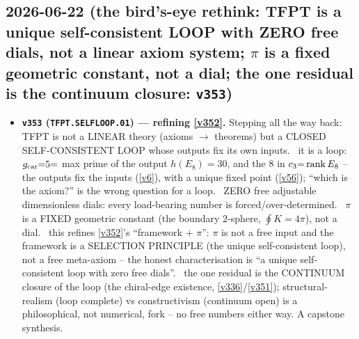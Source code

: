 \subsection*{2026-06-22 (the bird's-eye rethink: TFPT is a unique self-consistent LOOP with ZERO free dials, not a linear axiom system; $\pi$ is a fixed geometric constant, not a dial; the one residual is the continuum closure: \texttt{v353})}
\begin{itemize}
\item \textbf{\texttt{v353} (\texttt{TFPT.SELFLOOP.01}) --- refining \vref{v352}.} Stepping all the way back: TFPT is
not a LINEAR theory (axioms $\to$ theorems) but a CLOSED SELF-CONSISTENT LOOP whose outputs fix its own inputs.
\mE\ it is a loop: $g_{\mathrm{car}}{=}5{=}$ max prime of the output $h(E_8){=}30$, and the $8$ in $c_3{=}\operatorname{rank}
E_8$ -- the outputs fix the inputs (\vref{v6}), with a unique fixed point (\vref{v56}); ``which is the axiom?'' is
the wrong question for a loop. \mE\ ZERO free adjustable dimensionless dials: every load-bearing number is
forced/over-determined. \mE\ $\pi$ is a FIXED geometric constant (the boundary $2$-sphere, $\oint K{=}4\pi$), not a
dial. \mC\ this refines \vref{v352}'s ``framework $+$ $\pi$'': $\pi$ is not a free input and the framework is a
SELECTION PRINCIPLE (the unique self-consistent loop), not a free meta-axiom -- the honest characterisation is ``a
unique self-consistent loop with zero free dials''. \mO\ the one residual is the CONTINUUM closure of the loop (the
chiral-edge existence, \vref{v336}/\vref{v351}); structural-realism (loop complete) vs constructivism (continuum
open) is a philosophical, not numerical, fork -- no free numbers either way. A capstone synthesis.
\end{itemize}


